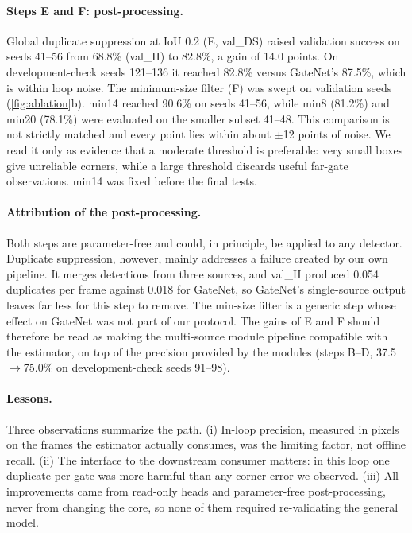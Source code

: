 \documentclass[10pt,twocolumn,letterpaper]{article}
\begin{document}
\paragraph{Steps E and F: post-processing.}
Global duplicate suppression at IoU 0.2 (E, val\_DS) raised validation success on seeds 41--56 from 68.8\% (val\_H) to 82.8\%, a gain of 14.0 points. On development-check seeds 121--136 it reached 82.8\% versus GateNet's 87.5\%, which is within loop noise. The minimum-size filter (F) was swept on validation seeds (\cref{fig:ablation}b). min14 reached 90.6\% on seeds 41--56, while min8 (81.2\%) and min20 (78.1\%) were evaluated on the smaller subset 41--48. This comparison is not strictly matched and every point lies within about $\pm$12 points of noise. We read it only as evidence that a moderate threshold is preferable: very small boxes give unreliable corners, while a large threshold discards useful far-gate observations. min14 was fixed before the final tests.

\paragraph{Attribution of the post-processing.}
Both steps are parameter-free and could, in principle, be applied to any detector. Duplicate suppression, however, mainly addresses a failure created by our own pipeline. It merges detections from three sources, and val\_H produced 0.054 duplicates per frame against 0.018 for GateNet, so GateNet's single-source output leaves far less for this step to remove. The min-size filter is a generic step whose effect on GateNet was not part of our protocol. The gains of E and F should therefore be read as making the multi-source module pipeline compatible with the estimator, on top of the precision provided by the modules (steps B--D, 37.5$\to$75.0\% on development-check seeds 91--98).

\paragraph{Lessons.}
Three observations summarize the path. (i) In-loop precision, measured in pixels on the frames the estimator actually consumes, was the limiting factor, not offline recall. (ii) The interface to the downstream consumer matters: in this loop one duplicate per gate was more harmful than any corner error we observed. (iii) All improvements came from read-only heads and parameter-free post-processing, never from changing the core, so none of them required re-validating the general model.
\end{document}
